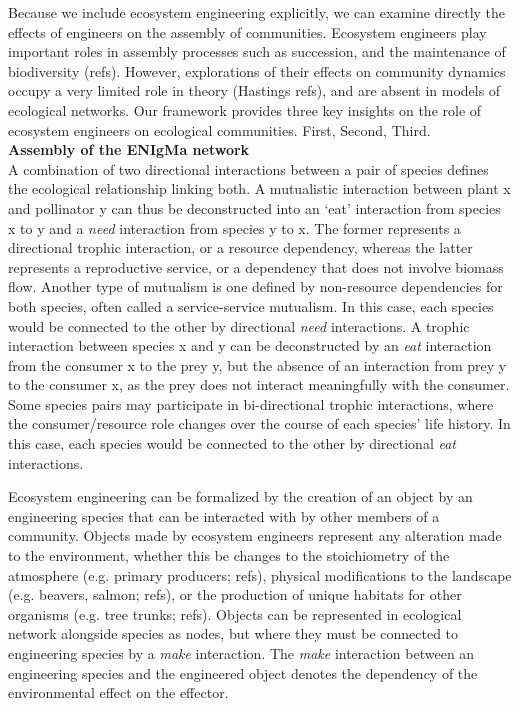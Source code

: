 \documentclass[9pt,twocolumn,twoside]{pnas-new}
\begin{document}
Because we include ecosystem engineering explicitly, we can examine directly the effects of engineers on the assembly of communities.
Ecosystem engineers play important roles in assembly processes such as succession, and the maintenance of biodiversity (refs).
However, explorations of their effects on community dynamics occupy a very limited role in theory (Hastings refs), and are absent in models of ecological networks.
Our framework provides three key insights on the role of ecosystem engineers on ecological communities.
First,
Second,
Third.\\

\noindent \textbf{Assembly of the ENIgMa network}\\
A combination of two directional interactions between a pair of species defines the ecological relationship linking both.
A mutualistic interaction between plant x and pollinator y can thus be deconstructed into an `eat' interaction from species x to y and a \emph{need} interaction from species y to x.
The former represents a directional trophic interaction, or a resource dependency, whereas the latter represents a reproductive service, or a dependency that does not involve biomass flow.
Another type of mutualism is one defined by non-resource dependencies for both species, often called a service-service mutualism.
In this case, each species would be connected to the other by directional \emph{need} interactions.
A trophic interaction between species x and y can be deconstructed by an \emph{eat} interaction from the consumer x to the prey y, but the absence of an interaction from prey y to the consumer x, as the prey does not interact meaningfully with the consumer.
Some species pairs may participate in bi-directional trophic interactions, where the consumer/resource role changes over the course of each species' life history.
In this case, each species would be connected to the other by directional \emph{eat} interactions.


Ecosystem engineering can be formalized by the creation of an object by an engineering species that can be interacted with by other members of a community.
Objects made by ecosystem engineers represent any alteration made to the environment, whether this be changes to the stoichiometry of the atmosphere (e.g. primary producers; refs), physical modifications to the landscape (e.g. beavers, salmon; refs), or the production of unique habitats for other organisms (e.g. tree trunks; refs).
Objects can be represented in ecological network alongside species as nodes, but where they must be connected to engineering species by a \emph{make} interaction.
The \emph{make} interaction between an engineering species and the engineered object denotes the dependency of the environmental effect on the effector.
\end{document}
